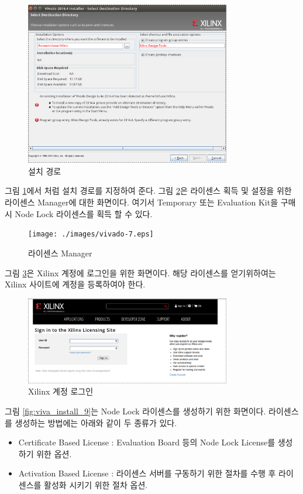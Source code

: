 \documentclass[11pt
  , a4paper
  , article
  , oneside
]{memoir}
\begin{document}
\begin{figure}[h!]
	\centering
	\includegraphics[width=0.8\textwidth, height=0.4\textwidth]{./images/vivado-5.eps}
	\caption{설치 경로}
	\label{fig:viva_install_5} 
\end{figure}	

그림 \ref{fig:viva_install_5}에서 처럼 설치 경로를 지정하여 준다. 그림 \ref{fig:viva_install_7}은 라이센스 획득 및 설정을 위한 라이센스 Manager에 대한 화면이다. 여기서 Temporary 또는 Evaluation Kit을 구매시 Node Lock 라이센스를 획득 할 수 있다.
\begin{figure}[h!]
	\centering
	\texttt{[image: ./images/vivado-7.eps]}
	\caption{라이센스 Manager}
	\label{fig:viva_install_7} 
\end{figure}

그림 \ref{fig:viva_install_8}은 Xilinx 계정에 로그인을 위한 화면이다. 해당 라이센스를 얻기위하여는 Xilinx 사이트에 계정을 등록하여야 한다.
\begin{figure}[h!]
	\centering
	\includegraphics[width=0.8\textwidth, height=0.4\textwidth]{./images/vivado-8.eps}
	\caption{Xilinx 계정 로그인}
	\label{fig:viva_install_8} 
\end{figure}
\hfil\break

그림 \ref{fig:viva_install_9}는 Node Lock 라이센스를 생성하기 위한 화면이다. 라이센스를 생성하는 방법에는 아래와 같이 두 종류가 있다.

\begin{itemize}
	\item Certificate Based License : Evaluation Board 등의 Node Lock License를 생성하기 위한 옵션.
	\item Activation Based License : 라이센스 서버를 구동하기 위한 절차를 수행 후 라이센스를 활성화 시키기 위한 절차 옵션.
\end{itemize}
\end{document}
